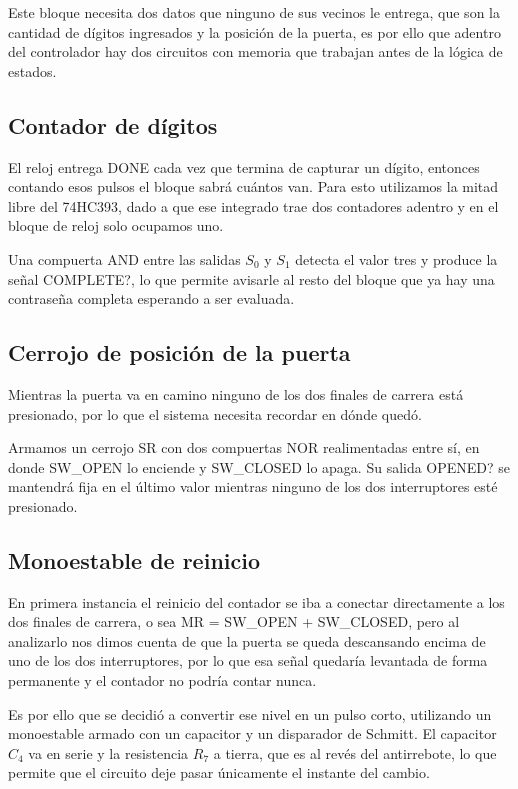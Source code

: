 \documentclass[12pt]{article}
\begin{document}
Este bloque necesita dos datos que ninguno de sus vecinos le entrega, que son la
cantidad de dígitos ingresados y la posición de la puerta, es por ello que adentro
del controlador hay dos circuitos con memoria que trabajan antes de la lógica de
estados.

\subsection{Contador de dígitos}

El reloj entrega DONE cada vez que termina de capturar un dígito, entonces
contando esos pulsos el bloque sabrá cuántos van. Para esto utilizamos la mitad
libre del 74HC393, dado a que ese integrado trae dos contadores adentro y en el
bloque de reloj solo ocupamos uno.

Una compuerta AND entre las salidas $S_0$ y $S_1$ detecta el valor tres y produce
la señal COMPLETE?, lo que permite avisarle al resto del bloque que ya hay una
contraseña completa esperando a ser evaluada.

\subsection{Cerrojo de posición de la puerta}

Mientras la puerta va en camino ninguno de los dos finales de carrera está
presionado, por lo que el sistema necesita recordar en dónde quedó.

Armamos un cerrojo SR con dos compuertas NOR realimentadas entre sí, en donde
SW\_OPEN lo enciende y SW\_CLOSED lo apaga. Su salida OPENED? se mantendrá fija en
el último valor mientras ninguno de los dos interruptores esté presionado.

\subsection{Monoestable de reinicio}

En primera instancia el reinicio del contador se iba a conectar directamente a los
dos finales de carrera, o sea MR = SW\_OPEN + SW\_CLOSED, pero al analizarlo nos
dimos cuenta de que la puerta se queda descansando encima de uno de los dos
interruptores, por lo que esa señal quedaría levantada de forma permanente y el
contador no podría contar nunca.

Es por ello que se decidió a convertir ese nivel en un pulso corto, utilizando un
monoestable armado con un capacitor y un disparador de Schmitt. El capacitor $C_4$
va en serie y la resistencia $R_7$ a tierra, que es al revés del antirrebote, lo
que permite que el circuito deje pasar únicamente el instante del cambio.
\end{document}
